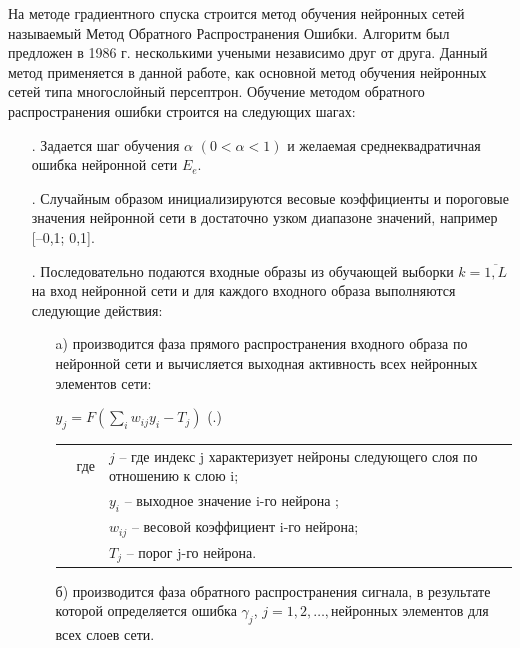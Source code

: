 	\par \redline На методе градиентного спуска строится метод обучения нейронных сетей называемый Метод Обратного Распространения Ошибки. Алгоритм был предложен в 1986 г. несколькими учеными независимо друг от друга. Данный метод применяется в данной работе, как основной метод обучения нейронных сетей типа многослойный персептрон. Обучение методом обратного распространения ошибки строится на следующих шагах:
	
	\begin{itemize}[leftmargin=2.15cm, labelwidth=0.65cm, labelsep=0.0cm] 
		
		\item[\theitemcntr. ] Задается шаг обучения $\alpha$  $(0 < \alpha < 1)$ и желаемая среднеквадратичная ошибка нейронной сети $E_e$.
		
		\addtocounter{itemcntr}{1}
		
		\item[\theitemcntr. ] Случайным образом инициализируются весовые коэффициенты и пороговые значения нейронной сети в достаточно узком диапазоне значений, например [–0,1; 0,1].
		
		\addtocounter{itemcntr}{1}
		
		\item[\theitemcntr. ] Последовательно подаются входные образы из обучающей выборки $k = \overline{1,L}$ на вход нейронной сети и для каждого входного образа выполняются следующие действия:
		
		\begin{itemize}[leftmargin=1.5cm, labelwidth=0.65cm, labelsep=0.0cm] 
			
			\item[a)] производится фаза прямого распространения входного образа по нейронной сети и вычисляется выходная активность всех нейронных элементов сети:
			
			\formulaspace \par \redline 
			$y_{j} = F(\sum \limits _{i}^{} w_{ij}y_{i} - T_{j}) $
			\hfill (\thechaptercntr .\theformulacntr) \redline
			\formulaspace \addtocounter{formulacntr}{1}
			
			\begin{tabular}{p{}p{}p{}}
				& где  & $j$ {--} где индекс j характеризует нейроны следующего слоя по отношению к
				слою i; \\
				&      & $y_{i}$ {--} выходное значение i-го нейрона ; \\
				&      & $w_{ij}$ {--} весовой коэффициент i-го нейрона; \\
				&      & $T_{j}$ {--} порог j-го нейрона. \\
			\end{tabular}
			\item[б)]	производится фаза обратного распространения сигнала, в результате которой определяется ошибка $\gamma_{j}$, $j=1,2,\dots, $нейронных элементов
			для всех слоев сети. 
			

\end{itemize}
\end{itemize}
